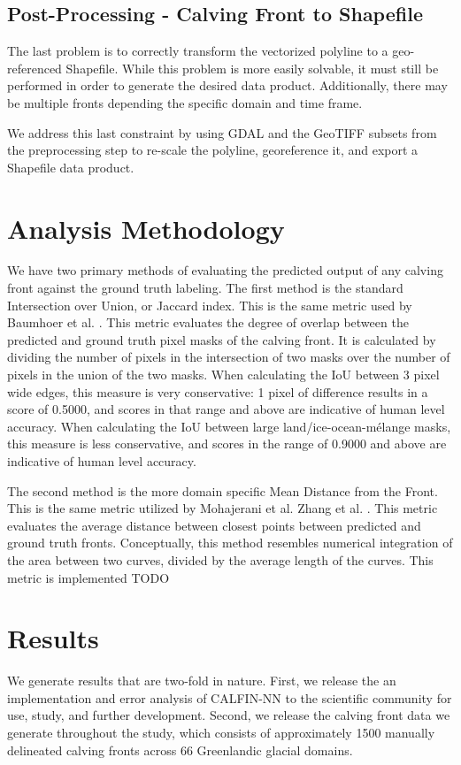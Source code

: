 \documentclass[tc, manuscript]{copernicus}
\begin{document}
\subsection{Post-Processing - Calving Front to Shapefile}
The last problem is to correctly transform the vectorized polyline to a geo-referenced Shapefile. While this problem is more easily solvable, it must still be performed in order to generate the desired data product. Additionally, there may be multiple fronts depending the specific domain and time frame. %

We address this last constraint by using GDAL and the GeoTIFF subsets from the preprocessing step to re-scale the polyline, georeference it, and export a Shapefile data product.


\section{Analysis Methodology}
We have two primary methods of evaluating the predicted output of any calving front against the ground truth labeling.
The first method is the standard Intersection over Union, or Jaccard index. This is the same metric used by Baumhoer et al. \citep{baumhoer2019}. This metric evaluates the degree of overlap between the predicted and ground truth pixel masks of the calving front. It is calculated by dividing the number of pixels in the intersection of two masks over the number of pixels in the union of the two masks. When calculating the IoU between 3 pixel wide edges, this measure is very conservative: 1 pixel of difference results in a score of 0.5000, and scores in that range and above are indicative of human level accuracy. When calculating the IoU between large land/ice-ocean-mélange masks, this measure is less conservative, and scores in the range of 0.9000 and above are indicative of human level accuracy.

The second method is the more domain specific Mean Distance from the Front. This is the same metric utilized by Mohajerani et al.\citep{mohajerani2019} Zhang et al. \citep{zhang2019}. This metric evaluates the average distance between closest points between predicted and ground truth fronts. Conceptually, this method resembles numerical integration of the area between two curves, divided by the average length of the curves. This metric is implemented TODO


\section{Results}
We generate results that are two-fold in nature. First, we release the an implementation and error analysis of CALFIN-NN to the scientific community for use, study, and further development. Second, we release the calving front data we generate throughout the study, which consists of approximately 1500 manually delineated calving fronts across 66 Greenlandic glacial domains.
\end{document}
